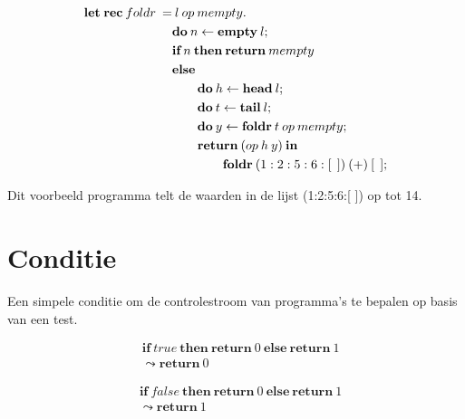 \begin{equation} \label{eq: sumEx}
    \begin{split}
        \textbf{let\:rec}\:foldr\:= &\:l\:op\:mempty.\: \\
        & \textbf{do}\:n\leftarrow \textbf{empty}\:l; \\
        & \textbf{if}\:n\:\textbf{then}\:\textbf{return}\:mempty \\
        & \textbf{else} \\
        & \qquad \textbf{do}\:h \leftarrow \textbf{head}\:l;\\
        & \qquad \textbf{do}\:t \leftarrow \textbf{tail}\:l; \\
        & \qquad \textbf{do}\:y \leftarrow \textbf{foldr}\:t\:op\:mempty    ; \\
        & \qquad \textbf{return}\:(op\:h\:y)\:\textbf{in} \\
        & \qquad \qquad \textbf{foldr}\:(1:2:5:6:[\:\:])\:(+)\:[\:\:];\\
    \end{split}
\end{equation}

Dit voorbeeld programma telt de waarden in de lijst (1:2:5:6:[ ]) op tot 14.

\section{Conditie}
Een simpele conditie om de controlestroom van programma's te bepalen op basis van een test.

\begin{equation}
    \begin{split}
        & \textbf{if}\  true \  \textbf{then} \  \textbf{return} \  0 \  \textbf{else} \  \textbf{return} \  1 \\
        & \leadsto \textbf{return}\  0
    \end{split}
\end{equation}

\begin{equation}
    \begin{split}
        & \textbf{if}\  false \  \textbf{then} \  \textbf{return} \  0 \  \textbf{else} \  \textbf{return} \  1 \\
        & \leadsto \textbf{return}\  1
    \end{split}
\end{equation}





